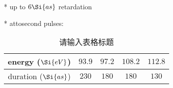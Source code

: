 
* up to $6 \Si{as}$ retardation

* attosecond pulses:
\begin{table}[ht]
\centering
\caption{请输入表格标题}\label{Osiand_tab1}
\begin{tabular}{|c|c|c|c|c|}
\hline
energy ($\Si{eV}$) & $93.9$ & $97.2$ & $108.2$ & $112.8$ \\
\hline
duration ($\Si{as}$) & $230$ & $180$ & $180$ & $130$ \\
\hline
\end{tabular}
\end{table}

